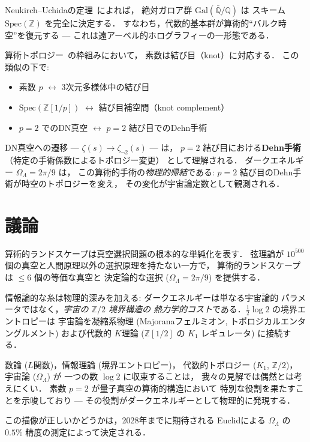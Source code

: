\documentclass[11pt,a4paper]{article}
\begin{document}
Neukirch--Uchidaの定理~\cite{NeukirchUchida}によれば，
絶対ガロア群 $\mathrm{Gal}(\bar{\mathbb{Q}}/\mathbb{Q})$ は
スキーム $\mathrm{Spec}(\mathbb{Z})$ を完全に決定する．
すなわち，代数的基本群が算術的``バルク時空''を復元する
--- これは遠アーベル的ホログラフィーの一形態である．

算術トポロジー~\cite{Morishita2012}の枠組みにおいて，
素数は結び目（knot）に対応する．
この類似の下で:
\begin{itemize}
\item 素数 $p$ $\leftrightarrow$ 3次元多様体中の結び目
\item $\mathrm{Spec}(\mathbb{Z}[1/p])$ $\leftrightarrow$ 結び目補空間（knot complement）
\item $p = 2$ でのDN真空 $\leftrightarrow$ $p = 2$ 結び目でのDehn手術
\end{itemize}

DN真空への遷移 --- $\zeta(s) \to \zeta_{\neg 2}(s)$ --- は，
$p = 2$ 結び目における\textbf{Dehn手術}（特定の手術係数によるトポロジー変更）
として理解される．
ダークエネルギー $\Omega_\Lambda = 2\pi/9$ は，
この算術的手術の\emph{物理的帰結}である:
$p = 2$ 結び目のDehn手術が時空のトポロジーを変え，
その変化が宇宙論定数として観測される．

\section{議論}

算術的ランドスケープは真空選択問題の根本的な単純化を表す．
弦理論が $10^{500}$ 個の真空と人間原理以外の選択原理を持たない一方で，
算術的ランドスケープは $\leq 6$ 個の等価な真空と
決定論的な選択 ($\Omega_\Lambda = 2\pi/9$) を提供する．

情報論的な糸は物理的深みを加える: ダークエネルギーは単なる宇宙論的
パラメータではなく，\emph{宇宙の $\mathbb{Z}/2$ 境界構造の
熱力学的コスト}である．$\frac{1}{2}\log 2$ の境界エントロピーは
宇宙論を凝縮系物理 (Majoranaフェルミオン, トポロジカルエンタングルメント)
および代数的 $K$理論 ($\mathbb{Z}[1/2]$ の $K_1$ レギュレータ) に接続する．

数論 ($L$関数)，情報理論 (境界エントロピー)，
代数的トポロジー ($K_1$, $\mathbb{Z}/2$)，
宇宙論 ($\Omega_\Lambda$) が
一つの数 $\log 2$ に収束することは，
我々の見解では偶然とは考えにくい．
素数 $p = 2$ が量子真空の算術的構造において
特別な役割を果たすことを示唆しており
--- その役割がダークエネルギーとして物理的に発現する．

この描像が正しいかどうかは，2028年までに期待される
Euclidによる $\Omega_\Lambda$ の $0.5\%$ 精度の測定によって決定される．
\end{document}
